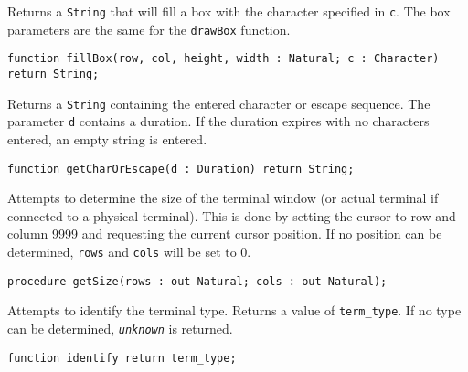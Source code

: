 \documentclass[10pt, openany]{book}
\newcommand{\function}[1]{\texttt{#1}}
\newcommand{\constant}[1]{\emph{\texttt{#1}}}
\newcommand{\keyword}[1]{\texttt{#1}}
\newcommand{\datatype}[1]{\texttt{#1}}
\begin{document}
Returns a \datatype{String} that will fill a box with the character specified in \keyword{c}.  The box parameters are the same for the \function{drawBox} function.
\begin{lstlisting}
function fillBox(row, col, height, width : Natural; c : Character) return String;
\end{lstlisting}

Returns a \datatype{String} containing the entered character or escape sequence.  The parameter \keyword{d} contains a duration.  If the duration expires with no characters entered, an empty string is entered.
\begin{lstlisting}
function getCharOrEscape(d : Duration) return String;
\end{lstlisting}

Attempts to determine the size of the terminal window (or actual terminal if connected to a physical terminal).  This is done by setting the cursor to row and column 9999 and requesting the current cursor position.  If no position can be determined, \keyword{rows} and \keyword{cols} will be set to 0.
\begin{lstlisting}
procedure getSize(rows : out Natural; cols : out Natural);
\end{lstlisting}

Attempts to identify the terminal type.  Returns a value of \datatype{term\_type}.  If no type can be determined, \constant{unknown} is returned.
\begin{lstlisting}
function identify return term_type;
\end{lstlisting}

\clearpage
%
%
\printindex[type]
\printindex[func]
%
%
\nocite{Ada95}
\nocite{Ada2012}
\nocite{Ada2022}
\nocite{xTerm}


\end{document}

